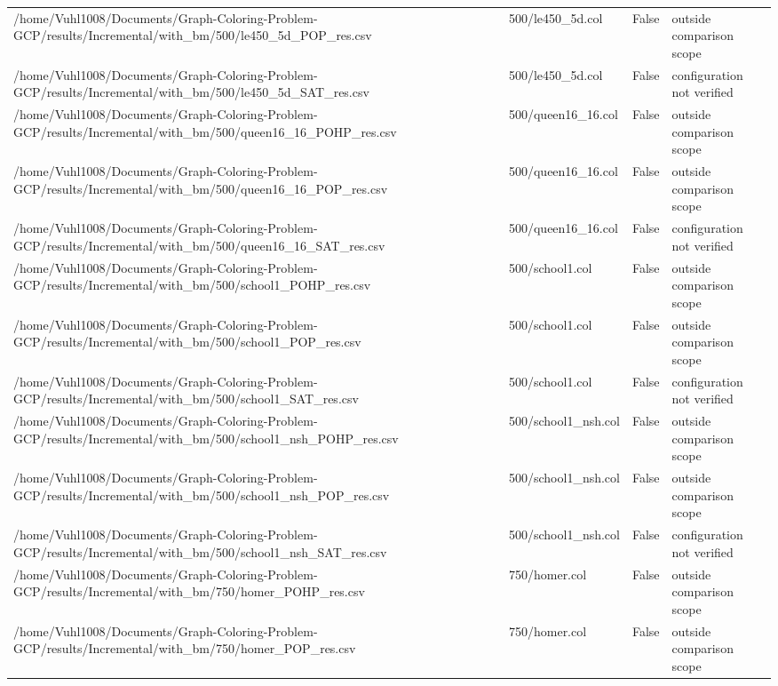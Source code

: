 \begin{table}[htbp]
\begin{tabular}{llll}
/home/Vuhl1008/Documents/Graph-Coloring-Problem-GCP/results/Incremental/with\_bm/500/le450\_5d\_POP\_res.csv & 500/le450\_5d.col & False & outside comparison scope \\
/home/Vuhl1008/Documents/Graph-Coloring-Problem-GCP/results/Incremental/with\_bm/500/le450\_5d\_SAT\_res.csv & 500/le450\_5d.col & False & configuration not verified \\
/home/Vuhl1008/Documents/Graph-Coloring-Problem-GCP/results/Incremental/with\_bm/500/queen16\_16\_POHP\_res.csv & 500/queen16\_16.col & False & outside comparison scope \\
/home/Vuhl1008/Documents/Graph-Coloring-Problem-GCP/results/Incremental/with\_bm/500/queen16\_16\_POP\_res.csv & 500/queen16\_16.col & False & outside comparison scope \\
/home/Vuhl1008/Documents/Graph-Coloring-Problem-GCP/results/Incremental/with\_bm/500/queen16\_16\_SAT\_res.csv & 500/queen16\_16.col & False & configuration not verified \\
/home/Vuhl1008/Documents/Graph-Coloring-Problem-GCP/results/Incremental/with\_bm/500/school1\_POHP\_res.csv & 500/school1.col & False & outside comparison scope \\
/home/Vuhl1008/Documents/Graph-Coloring-Problem-GCP/results/Incremental/with\_bm/500/school1\_POP\_res.csv & 500/school1.col & False & outside comparison scope \\
/home/Vuhl1008/Documents/Graph-Coloring-Problem-GCP/results/Incremental/with\_bm/500/school1\_SAT\_res.csv & 500/school1.col & False & configuration not verified \\
/home/Vuhl1008/Documents/Graph-Coloring-Problem-GCP/results/Incremental/with\_bm/500/school1\_nsh\_POHP\_res.csv & 500/school1\_nsh.col & False & outside comparison scope \\
/home/Vuhl1008/Documents/Graph-Coloring-Problem-GCP/results/Incremental/with\_bm/500/school1\_nsh\_POP\_res.csv & 500/school1\_nsh.col & False & outside comparison scope \\
/home/Vuhl1008/Documents/Graph-Coloring-Problem-GCP/results/Incremental/with\_bm/500/school1\_nsh\_SAT\_res.csv & 500/school1\_nsh.col & False & configuration not verified \\
/home/Vuhl1008/Documents/Graph-Coloring-Problem-GCP/results/Incremental/with\_bm/750/homer\_POHP\_res.csv & 750/homer.col & False & outside comparison scope \\
/home/Vuhl1008/Documents/Graph-Coloring-Problem-GCP/results/Incremental/with\_bm/750/homer\_POP\_res.csv & 750/homer.col & False & outside comparison scope \\

\end{tabular}
\end{table}
